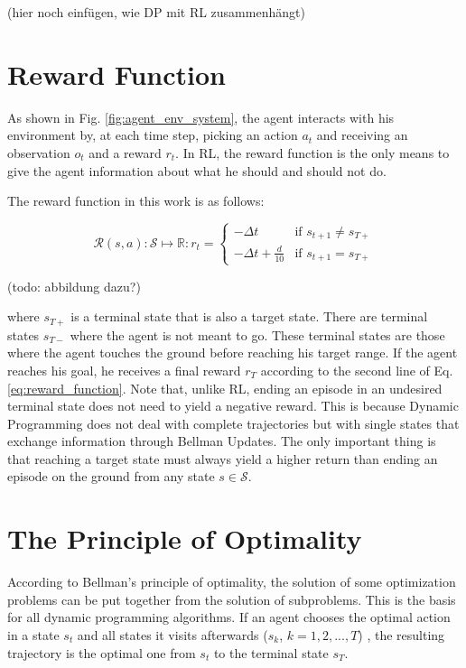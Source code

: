 (hier noch einfügen, wie DP mit RL zusammenhängt)

\section{Reward Function}
\label{sec:reward}

As shown in Fig. \ref{fig:agent_env_system}, the agent interacts with his environment by, at each time step, picking an action $a_t$ and receiving an observation $o_t$ and a reward $r_t$. In RL, the reward function is the only means to give the agent information about what he should and should not do.

The reward function in this work is as follows:

\begin{equation}
\mathcal{R}(s,a): \mathcal{S} \mapsto \mathbb{R}: r_t =
\begin{cases}
-\Delta t & \text{if } s_{t+1} \neq s_{T+}\\
-\Delta t + \frac{d}{10} & \text{if } s_{t+1} = s_{T+}
\end{cases}
\label{eq:reward_function}
\end{equation}

(todo: abbildung dazu?)

where $s_{T+}$ is a terminal state that is also a target state. There are terminal states $s_{T-}$ where the agent is not meant to go. These terminal states are those where the agent touches the ground before reaching his target range. If the agent reaches his goal, he receives a final reward $r_T$ according to the second line of Eq. \ref{eq:reward_function}. Note that, unlike RL, ending an episode in an undesired terminal state does not need to yield a negative reward. This is because Dynamic Programming does not deal with complete trajectories but with single states that exchange information through Bellman Updates. The only important thing is that reaching a target state must always yield a higher return than ending an episode on the ground from any state $s \in \mathcal{S}$.


\section{The Principle of Optimality}
\label{sec:optimality}

According to Bellman's principle of optimality, the solution of some optimization problems can be put together from the solution of subproblems. This is the basis for all dynamic programming algorithms. If an agent chooses the optimal action in a state $s_t$ and all states it visits afterwards ($s_k$, $k=1, 2, ...,T$) , the resulting trajectory is the optimal one from $s_t$ to the terminal state $s_T$.

